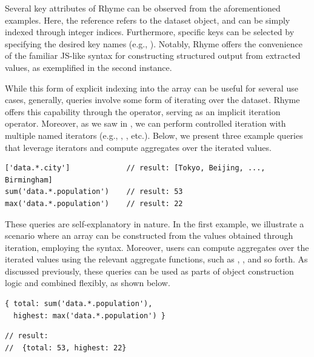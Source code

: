 \documentclass[runningheads]{llncs}
\newcommand{\lang}{Rhyme}
\begin{document}
Several key attributes of \lang{} can be observed from the aforementioned examples.
Here, the reference  refers to
the dataset object, 
and can be simply indexed through integer indices.
Furthermore, specific keys can be selected by specifying the desired
key names (e.g., ).
Notably, \lang{} offers the convenience of the familiar JS-like syntax for constructing
structured output from extracted values, as exemplified in the second instance.

While this form of explicit indexing into the array can be useful for several
use cases, generally, queries involve some form of iterating over the dataset.
\lang{} offers this capability through the \inline{*} operator,
serving as an implicit iteration operator.
Moreover, as we saw in , we can perform controlled iteration with multiple
named iterators (e.g., , , etc.).
Below, we present three example queries that leverage iterators and compute
aggregates over the iterated values.

\begin{lstlisting}[style=JavaScript, columns=flexible]
['data.*.city']             // result: [Tokyo, Beijing, ..., Birmingham]
sum('data.*.population')    // result: 53
max('data.*.population')    // result: 22
\end{lstlisting}

These queries are self-explanatory in nature.
In the first example, we illustrate a scenario where an array can be constructed
from the values obtained through iteration, employing the \inline{[...]} syntax.
Moreover, users can compute aggregates over the iterated values using the
relevant aggregate functions, such as , , and so forth.
As discussed previously, these queries can be used as parts of object
construction logic and combined flexibly, as shown below.

\hspace{-18pt}
\begin{minipage}{0.5\textwidth}
\begin{lstlisting}[style=JavaScript, columns=flexible, numbers=none]
{ total: sum('data.*.population'), 
  highest: max('data.*.population') }
\end{lstlisting}
\end{minipage}%
\begin{minipage}{0.5\textwidth}
\begin{lstlisting}[style=JavaScript, columns=flexible, numbers=none]
// result: 
//  {total: 53, highest: 22}
\end{lstlisting}
\end{minipage}
\end{document}
